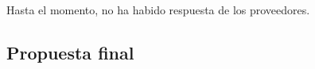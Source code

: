 



Hasta el momento, no ha habido respuesta de los proveedores.

\subsection{Propuesta final}
\label{sec:ppfinal}


